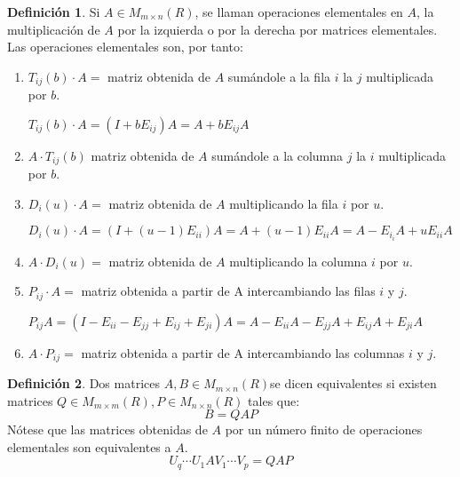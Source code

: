 \documentclass{article}
\theoremstyle{theorem-style}  %
\theoremstyle{definition}
\newtheorem{definition}{Definición}[section]
\theoremstyle{example-style}
\begin{document}
	\begin{definition}
		Si $ A\in M_{m \times n}(R) $, se llaman operaciones elementales en $ A $, la multiplicación de $ A $ por la izquierda o por la derecha por matrices elementales. 
		Las operaciones elementales son, por tanto:
		\begin{enumerate}
			\item $ T_{ij}(b) \cdot A = $ matriz obtenida de $ A $ sumándole a la fila $ i $ la $ j $ multiplicada por $ b $. 
			
			$T_{ij}(b) \cdot A=(I+bE_{ij})A=A+bE_{ij}A$
			\item $ A \cdot T_{ij}(b) $ matriz obtenida de $ A $ sumándole a la columna $ j $ la $ i $ multiplicada por $ b $.
			\item $ D_i(u) \cdot A =$ matriz obtenida de $ A $ multiplicando la fila $ i $ por $ u $.
			
			$ D_i(u)\cdot A= (I+(u-1)E_{ii})A=A+(u-1) E_{ii}A=A-E_{i_i} A +uE_{ii}A $
			\item $ A \cdot D_i(u)  =$ matriz obtenida de $ A $ multiplicando la columna $ i $ por $ u $.
			\item $ P_{ij} \cdot A = $ matriz obtenida a partir de A intercambiando las filas $ i $ y $ j $.
			
			$ P_{ij}A= (I-E_{ii}-E_{jj}+E_{ij}+E_{ji})A=A-E_{ii}A-E_{jj}A+E_{ij}A+E_{ji}A $  
			\item $ A \cdot P_{ij}= $ matriz obtenida a partir de A intercambiando las columnas $ i $ y $ j $.
		\end{enumerate}
	\end{definition}
	\begin{definition}
		Dos matrices $ A, B \in M_{m\times n}(R)  $se dicen equivalentes si existen matrices $ Q \in M_{m\times m}(R), P \in M_{n\times n}(R) $ tales que: 
		\[ B=QAP \]
		Nótese que las matrices obtenidas de $ A $ por un número finito de operaciones elementales son equivalentes a $ A $.
		\[ U_q \cdots U_1AV_1\cdots V_p=QAP\]
	\end{definition}
\end{document}

